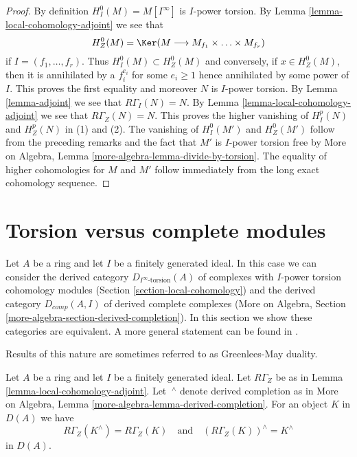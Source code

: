 \begin{proof}
By definition $H^0_I(M) = M[I^\infty]$ is $I$-power torsion.
By Lemma \ref{lemma-local-cohomology-adjoint} we see that
$$
H^0_Z(M) = \Ker(M \longrightarrow M_{f_1} \times \ldots \times M_{f_r})
$$
if $I = (f_1, \ldots, f_r)$. Thus $H^0_I(M) \subset H^0_Z(M)$ and
conversely, if $x \in H^0_Z(M)$, then it is annihilated by a $f_i^{e_i}$
for some $e_i \geq 1$ hence annihilated by some power of $I$.
This proves the first equality and moreover $N$ is $I$-power torsion.
By Lemma \ref{lemma-adjoint} we see that $R\Gamma_I(N) = N$.
By Lemma \ref{lemma-local-cohomology-adjoint} we see that $R\Gamma_Z(N) = N$.
This proves the higher vanishing of $H^p_I(N)$ and $H^p_Z(N)$ in (1) and (2).
The vanishing of $H^0_I(M')$ and $H^0_Z(M')$ follow from the preceding
remarks and the fact that $M'$ is $I$-power torsion free by
More on Algebra, Lemma \ref{more-algebra-lemma-divide-by-torsion}.
The equality of higher cohomologies for $M$ and $M'$ follow
immediately from the long exact cohomology sequence.
\end{proof}









\section{Torsion versus complete modules}
\label{section-torsion-and-complete}

\noindent
Let $A$ be a ring and let $I$ be a finitely generated ideal.
In this case we can consider the derived category
$D_{I^\infty\text{-torsion}}(A)$ of complexes
with $I$-power torsion cohomology modules
(Section \ref{section-local-cohomology})
and the derived category
$D_{comp}(A, I)$ of derived complete complexes
(More on Algebra, Section \ref{more-algebra-section-derived-completion}).
In this section we show these categories are equivalent.
A more general statement can be found in
\cite{Dwyer-Greenlees}.

\begin{lemma}
\label{lemma-complete-and-local}
\begin{slogan}
Results of this nature are sometimes referred to as Greenlees-May duality.
\end{slogan}
Let $A$ be a ring and let $I$ be a finitely generated ideal.
Let $R\Gamma_Z$ be as in Lemma \ref{lemma-local-cohomology-adjoint}.
Let ${\ }^\wedge$ denote derived completion as in
More on Algebra, Lemma \ref{more-algebra-lemma-derived-completion}.
For an object $K$ in $D(A)$ we have
$$
R\Gamma_Z(K^\wedge) = R\Gamma_Z(K)
\quad\text{and}\quad
(R\Gamma_Z(K))^\wedge = K^\wedge
$$
in $D(A)$.
\end{lemma}


